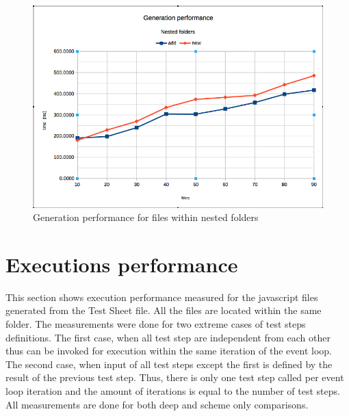 \begin{figure}[ht]
	\label{fig:gn}
	\centering
	\includegraphics[width=\textwidth]{grafiken/generation_nested}
	\caption{Generation performance for files within nested folders}
\end{figure}

\section{Executions performance}
This section shows execution performance measured for the javascript files generated from the Test Sheet file. All the files are located within the same folder. The measurements were done for two extreme cases of test steps definitions. The first case, when all test step are independent from each other thus can be invoked for execution within the same iteration of the event loop. The second case, when input of all test steps except the first is defined by the result of the previous test step. Thus, there is only one test step called per event loop iteration and the amount of iterations is equal to the number of test steps.
All measurements are done for both deep and scheme only comparisons.


